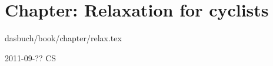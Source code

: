 

\section{Chapter: Relaxation for cyclists}
\label{c-relax}\noindent dasbuch/book/chapter/relax.tex
\begin{description}\item[2011-09-?? CS]

\end{description}


%
%
%
%
%
%
%
%
%
%
%
%
%
%
